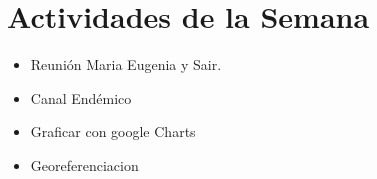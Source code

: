 \section{Actividades de la Semana}

\begin{itemize}
	\item Reunión Maria Eugenia y Sair.
	\item Canal Endémico
	\item Graficar con google Charts
	\item Georeferenciacion
\end{itemize}
